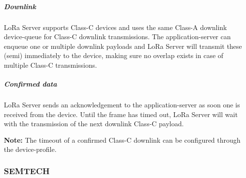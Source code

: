 \subparagraph{Downlink}
LoRa Server supports Class-C devices and uses the same Class-A downlink device-queue for Class-C downlink transmissions.
The application-server can enqueue one or multiple downlink payloads and LoRa Server will transmit these (semi) immediately to the device,
	making sure no overlap exists in case of multiple Class-C transmissions.

\subparagraph{Confirmed data}
LoRa Server sends an acknowledgement to the application-server as soon one is received from the device.
Until the frame has timed out,
	LoRa Server will wait with the transmission of the next downlink Class-C payload.

\textbf{Note:} The timeout of a confirmed Class-C downlink can be configured through the device-profile.




\subsubsection{SEMTECH}



